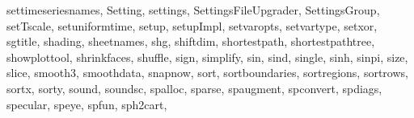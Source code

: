{{        settimeseriesnames,%
        Setting,%
        settings,%
        SettingsFileUpgrader,%
        SettingsGroup,%
        setTscale,%
        setuniformtime,%
        setup,%
        setupImpl,%
        setvaropts,%
        setvartype,%
        setxor,%
        sgtitle,%
        shading,%
        sheetnames,%
        shg,%
        shiftdim,%
        shortestpath,%
        shortestpathtree,%
        showplottool,%
        shrinkfaces,%
        shuffle,%
        sign,%
        simplify,%
        sin,%
        sind,%
        single,%
        sinh,%
        sinpi,%
        size,%
        slice,%
        smooth3,%
        smoothdata,%
        snapnow,%
        sort,%
        sortboundaries,%
        sortregions,%
        sortrows,%
        sortx,%
        sorty,%
        sound,%
        soundsc,%
        spalloc,%
        sparse,%
        spaugment,%
        spconvert,%
        spdiags,%
        specular,%
        speye,%
        spfun,%
        sph2cart,%
}}
